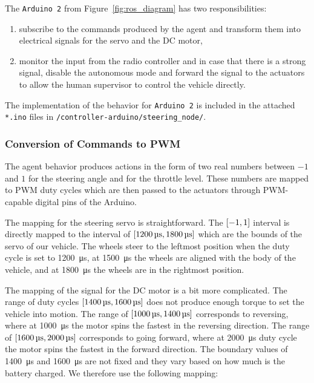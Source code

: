 The \verb|Arduino 2| from Figure~\ref{fig:ros_diagram} has two responsibilities:

\begin{enumerate}[label=(\roman*)]
	\item subscribe to the commands produced by the agent and transform them into electrical signals for the servo and the \gls*{DC} motor,
	\item monitor the input from the radio controller and in case that there is a strong signal, disable the autonomous mode and forward the signal to the actuators to allow the human supervisor to control the vehicle directly.
\end{enumerate}

The implementation of the behavior for \verb|Arduino 2| is included in the attached \verb|*.ino| files in \verb|/controller-arduino/steering_node/|.

\subsubsection{Conversion of Commands to PWM}

The agent behavior produces actions in the form of two real numbers between $-1$ and $1$ for the steering angle and for the throttle level. These numbers are mapped to \gls*{PWM} duty cycles which are then passed to the actuators through PWM-capable digital pins of the Arduino.

The mapping for the steering servo is straightforward. The $\interval{-1}{1}$ interval is directly mapped to the interval of $\interval{\SI{1200}{\micro\second}}{\SI{1800}{\micro\second}}$ which are the bounds of the servo of our vehicle. The wheels steer to the leftmost position when the duty cycle is set to \SI{1200}{\micro\second}, at \SI{1500}{\micro\second} the wheels are aligned with the body of the vehicle, and at \SI{1800}{\micro\second} the wheels are in the rightmost position.

The mapping of the signal for the \gls*{DC} motor is a bit more complicated. The range of duty cycles $\interval{\SI{1400}{\micro\second}}{\SI{1600}{\micro\second}}$ does not produce enough torque to set the vehicle into motion. The range of $\interval{\SI{1000}{\micro\second}}{\SI{1400}{\micro\second}}$ corresponds to reversing, where at \SI{1000}{\micro\second} the motor spins the fastest in the reversing direction. The range of $\interval{\SI{1600}{\micro\second}} {\SI{2000}{\micro\second}}$ corresponds to going forward, where at \SI{2000}{\micro\second} duty cycle the motor spins the fastest in the forward direction. The boundary values of \SI{1400}{\micro\second} and \SI{1600}{\micro\second} are not fixed and they vary based on how much is the battery charged. We therefore use the following mapping:


